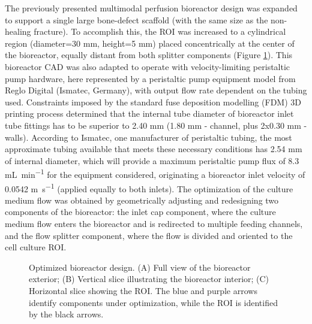 The previously presented multimodal perfusion bioreactor design was expanded to support a single large bone-defect scaffold (with the same size as the non-healing fracture). To accomplish this, the \ac{ROI} was increased to a cylindrical region (diameter=30 mm, height=5 mm) placed concentrically at the center of the bioreactor, equally distant from both splitter components (Figure \ref{fig3d3}). This bioreactor \ac{CAD} was also adapted to operate with velocity-limiting peristaltic pump hardware, here represented by a peristaltic pump equipment model from Reglo Digital (Ismatec, Germany), with output flow rate dependent on the tubing used. Constraints imposed by the standard fuse deposition modelling (\acs{FDM}) 3D printing process determined that the internal tube diameter of bioreactor inlet tube fittings has to be superior to 2.40 \si{\milli\meter} (1.80 \si{\milli\meter} - channel, plus 2x0.30 \si{\milli\meter} - walls). According to Ismatec, one manufacturer of peristaltic tubing, the most approximate tubing available that meets these necessary conditions has 2.54 \si{\milli\meter} of internal diameter, which will provide a maximum peristaltic pump flux of 8.3 \si{\milli\liter\per\minute} for the equipment considered, originating a bioreactor inlet velocity of 0.0542 \si{\meter\per\second} (applied equally to both inlets). The optimization of the culture medium flow was obtained by geometrically adjusting and redesigning two components of the bioreactor: the inlet cap component, where the culture medium flow enters the bioreactor and is redirected to multiple feeding channels, and the flow splitter component, where the flow is divided and oriented to the cell culture \ac{ROI}.

\begin{figure}
\caption{Optimized bioreactor design. (A) Full view of the bioreactor exterior; (B) Vertical slice illustrating the bioreactor
interior; (C) Horizontal slice showing the \ac{ROI}. The blue and purple arrows identify components under optimization, while
the \ac{ROI} is identified by the black arrows.}
\label{fig3d3}
\end{figure} 





